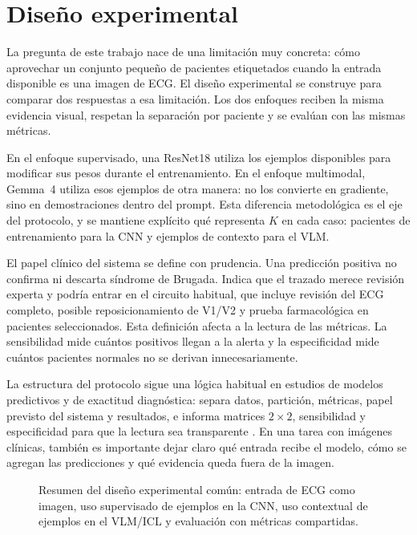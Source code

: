 \chapter{Diseño experimental}
\label{chap:diseno}

La pregunta de este trabajo nace de una limitación muy concreta: cómo aprovechar un conjunto pequeño de pacientes etiquetados cuando la entrada disponible es una imagen de ECG. El diseño experimental se construye para comparar dos respuestas a esa limitación. Los dos enfoques reciben la misma evidencia visual, respetan la separación por paciente y se evalúan con las mismas métricas.

En el enfoque supervisado, una ResNet18 utiliza los ejemplos disponibles para modificar sus pesos durante el entrenamiento. En el enfoque multimodal, Gemma~4 utiliza esos ejemplos de otra manera: no los convierte en gradiente, sino en demostraciones dentro del prompt. Esta diferencia metodológica es el eje del protocolo, y se mantiene explícito qué representa \(K\) en cada caso: pacientes de entrenamiento para la CNN y ejemplos de contexto para el VLM.

El papel clínico del sistema se define con prudencia. Una predicción positiva no confirma ni descarta síndrome de Brugada. Indica que el trazado merece revisión experta y podría entrar en el circuito habitual, que incluye revisión del ECG completo, posible reposicionamiento de V1/V2 y prueba farmacológica en pacientes seleccionados. Esta definición afecta a la lectura de las métricas. La sensibilidad mide cuántos positivos llegan a la alerta y la especificidad mide cuántos pacientes normales no se derivan innecesariamente.

La estructura del protocolo sigue una lógica habitual en estudios de modelos predictivos y de exactitud diagnóstica: separa datos, partición, métricas, papel previsto del sistema y resultados, e informa matrices \(2\times2\), sensibilidad y especificidad para que la lectura sea transparente \cite{collins2024tripodai,bossuyt2015stard,sounderajah2025stardai}. En una tarea con imágenes clínicas, también es importante dejar claro qué entrada recibe el modelo, cómo se agregan las predicciones y qué evidencia queda fuera de la imagen.

\begin{figure}[H]
  \centering
  \caption{Resumen del diseño experimental común: entrada de ECG como imagen, uso supervisado de ejemplos en la CNN, uso contextual de ejemplos en el VLM/ICL y evaluación con métricas compartidas.}
  \label{fig:diseno_experimental_resumen}
\end{figure}

